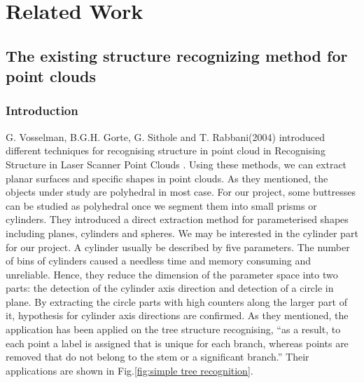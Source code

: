 \documentclass[runningheads,a4paper]{llncs}
\begin{document}
\section{Related Work}
\subsection{The existing structure recognizing method for point clouds}
\subsubsection{Introduction}
G. Vosselman, B.G.H. Gorte, G. Sithole and T. Rabbani(2004) introduced different techniques for recognising structure in point cloud in Recognising Structure in Laser Scanner Point Clouds \cite{6}. Using these methods, we can extract planar surfaces and specific shapes in point clouds. As they mentioned, the objects under study are polyhedral in most case. For our project, some buttresses can be studied as polyhedral once we segment them into small prisms or cylinders. They introduced a direct extraction method for parameterised shapes including planes, cylinders and spheres. We may be interested in the cylinder part for our project. A cylinder usually be described by five parameters. The number of bins of cylinders caused a needless time and memory consuming and unreliable. Hence, they reduce the dimension of the parameter space into two parts: the detection of the cylinder axis direction and detection of a circle in plane. By extracting the circle parts with high counters along the larger part of it, hypothesis for cylinder axis directions are confirmed. As they mentioned, the application has been applied on the tree structure recognising, “as a result, to each point a label is assigned that is unique for each branch, whereas points are removed that do not belong to the stem or a significant branch.”  Their applications are shown in Fig.\ref{fig:simple tree recognition}.
\end{document}
